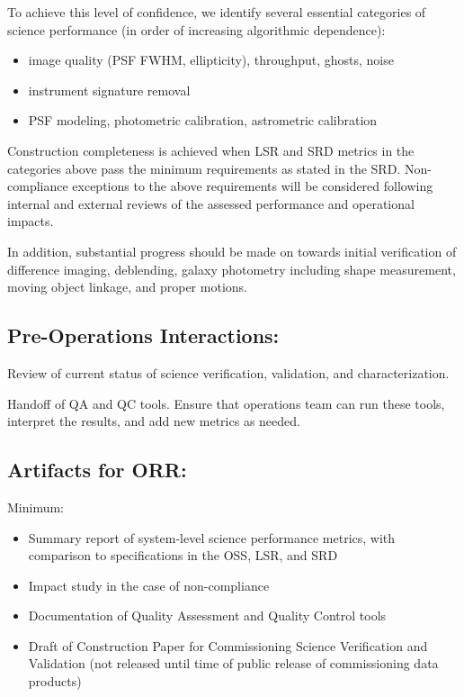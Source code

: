 To achieve this level of confidence, we identify several essential categories of science performance (in order of increasing algorithmic dependence):

\begin{itemize}
\item image quality (PSF FWHM, ellipticity), throughput, ghosts, noise
\item instrument signature removal
\item PSF modeling, photometric calibration, astrometric calibration
\end{itemize}

Construction completeness is achieved when LSR and SRD metrics in the categories above pass the minimum requirements as stated in the SRD. Non-compliance exceptions to the above requirements will be considered following internal and external reviews of the assessed performance and operational impacts.

In addition, substantial progress should be made on towards initial verification of difference imaging, deblending, galaxy photometry including shape measurement, moving object linkage, and proper motions.

\subsection{Pre-Operations Interactions:}

Review of current status of science verification, validation, and characterization.

Handoff of QA and QC tools. Ensure that operations team can run these tools, interpret the results, and add new metrics as needed.

\subsection{Artifacts for ORR:}

Minimum:

\begin{itemize}
\item Summary report of system-level science performance metrics, with comparison to specifications in the OSS, LSR, and SRD
\item Impact study in the case of non-compliance
\item Documentation of Quality Assessment and Quality Control tools
\item Draft of Construction Paper for Commissioning Science Verification and Validation (not released until time of public release of commissioning data products)
\end{itemize}

